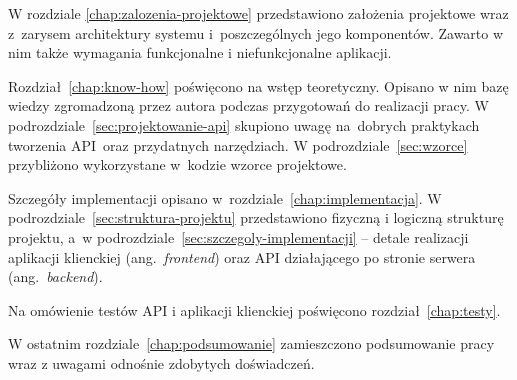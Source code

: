 W rozdziale \ref{chap:zalozenia-projektowe} przedstawiono założenia projektowe wraz z~zarysem architektury systemu i~poszczególnych jego komponentów. Zawarto w nim także wymagania funkcjonalne i niefunkcjonalne aplikacji.

Rozdział~\ref{chap:know-how} poświęcono na wstęp teoretyczny. Opisano w nim bazę wiedzy zgromadzoną przez autora podczas przygotowań do realizacji pracy. W podrozdziale~\ref{sec:projektowanie-api} skupiono uwagę na~dobrych praktykach tworzenia API~oraz przydatnych narzędziach. W podrozdziale~\ref{sec:wzorce} przybliżono wykorzystane w~kodzie wzorce projektowe.

Szczegóły implementacji opisano w~rozdziale~\ref{chap:implementacja}. W podrozdziale~\ref{sec:struktura-projektu} przedstawiono fizyczną i logiczną strukturę projektu, a~w podrozdziale~\ref{sec:szczegoly-implementacji} -- detale realizacji aplikacji klienckiej (ang.~\emph{frontend}) oraz API działającego po stronie serwera (ang.~\emph{backend}).

Na omówienie testów API i aplikacji klienckiej poświęcono rozdział~\ref{chap:testy}. 

W ostatnim rozdziale~\ref{chap:podsumowanie} zamieszczono podsumowanie pracy wraz z uwagami odnośnie zdobytych doświadczeń.